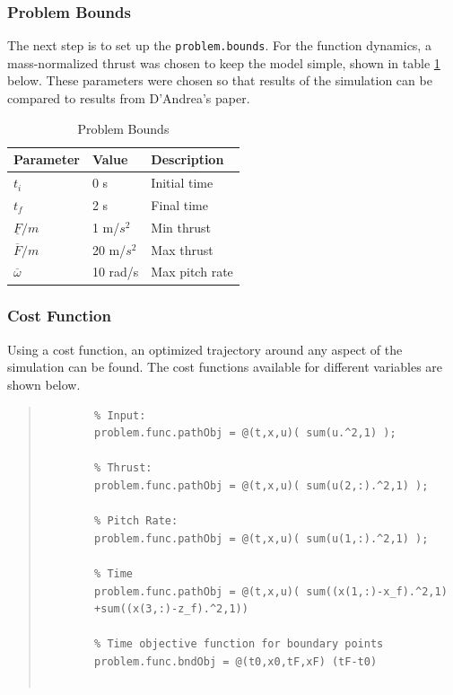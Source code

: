 \documentclass[12pt]{article}
\begin{document}
	\subsubsection{Problem Bounds}
	The next step is to set up the \lstinline!problem.bounds!. For the function dynamics, a mass-normalized thrust was chosen to keep the model simple, shown in table \ref{Problem Bounds} below. These parameters were chosen so that results of the simulation can be compared to results from D'Andrea's paper\cite{D'Andrea}. 
	
	\begin{table}[H]
		\begin{center}
			\begin{tabular}{ |p{2.5cm}||p{2cm}||p{3cm}| }
				
				\hline
				Parameter & Value & Description\\
				\hline
				$t_{i}$   & 0 s  & Initial time\\
				$t_{f}$  & 2 s  & Final time\\
				$\underline{F}/m$ & 1 m/$s^{2}$ & Min thrust\\
				$\overline{F}/m$ & 20 m/$s^{2}$ & Max thrust\\
				$\overline{\omega}$ & 10 rad/s & Max pitch rate \\
				\hline
			\end{tabular}
			\caption{Problem Bounds }
			\label{Problem Bounds}
		\end{center}
	\end{table}
	
	\clearpage
	
	\subsubsection{Cost Function}
	Using a cost function, an optimized trajectory around any aspect of the simulation can be found. The cost functions available for different variables are shown below. 
	\begin{quote}
		\begin{lstlisting}
		% Input:
		problem.func.pathObj = @(t,x,u)( sum(u.^2,1) );
		
		% Thrust:
		problem.func.pathObj = @(t,x,u)( sum(u(2,:).^2,1) );
		
		% Pitch Rate:
		problem.func.pathObj = @(t,x,u)( sum(u(1,:).^2,1) );
		
		% Time
		problem.func.pathObj = @(t,x,u)( sum((x(1,:)-x_f).^2,1) 
		+sum((x(3,:)-z_f).^2,1))
		
		% Time objective function for boundary points
		problem.func.bndObj = @(t0,x0,tF,xF) (tF-t0)
		
		\end{lstlisting}
	\end{quote}
	
\end{document}
